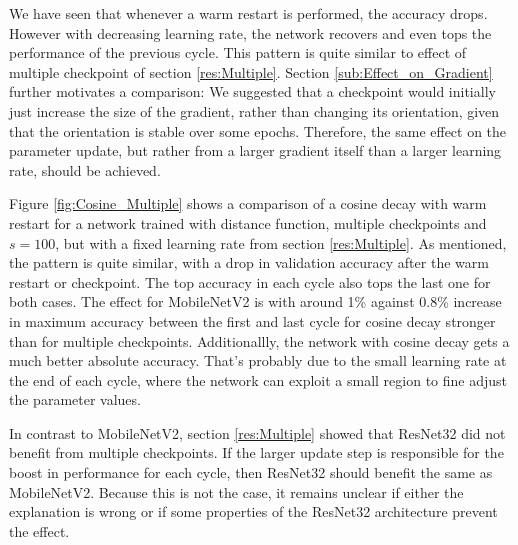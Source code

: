 We have seen that whenever a warm restart is performed, the accuracy drops.
However with decreasing learning rate, the network recovers and even tops the
performance of the previous cycle. This pattern is quite similar to effect of
multiple checkpoint of section \ref{res:Multiple}. Section
\ref{sub:Effect_on_Gradient} further motivates a comparison: We suggested that a
checkpoint would initially just increase the size of the gradient, rather than
changing its orientation, given that the orientation is stable over some epochs.
Therefore, the same effect on the parameter update, but rather from a larger
gradient itself than a larger learning rate, should be achieved.

Figure \ref{fig:Cosine_Multiple} shows a comparison of a cosine decay with warm
restart for a network trained with distance function, multiple checkpoints and
$s=100$, but with a fixed learning rate from section \ref{res:Multiple}. As
mentioned, the pattern is quite similar, with a drop in validation accuracy
after the warm restart or checkpoint. The top accuracy in each cycle also tops
the last one for both cases. The effect for MobileNetV2 is with around 1\%
against 0.8\% increase in maximum accuracy between the first and last cycle for
cosine decay stronger than for multiple checkpoints. Additionallly, the network
with cosine decay gets a much better absolute accuracy. That's probably due to
the small learning rate at the end of each cycle, where the network can exploit
a small region to fine adjust the parameter values.

In contrast to MobileNetV2, section \ref{res:Multiple} showed that ResNet32
did not benefit from multiple checkpoints. If the larger update step is responsible
for the boost in performance for each cycle, then ResNet32 should benefit the
same as MobileNetV2. Because this is not the case, it remains unclear if either
the explanation is wrong or if some properties of the ResNet32 architecture
prevent the effect.
\pagebreak


